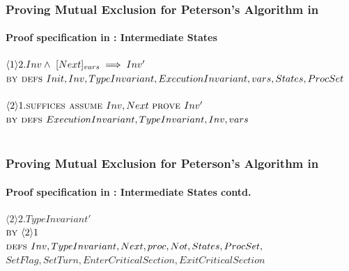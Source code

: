 \documentclass[xcolor=dvipsnames]{beamer}
\begin{document}
\begin{frame}
	\frametitle{Proving Mutual Exclusion for Peterson's Algorithm in \tla}
	\framesubtitle{Proof specification in \tla : Intermediate States}
	\fontsize{8}{7.2}\selectfont
	\hspace*{0cm}$\langle1\rangle2. Inv \land \  [Next]_{vars} \implies Inv'$\\
	\hspace*{0.4cm} $\textsc{by } \textsc{defs } Init, Inv, TypeInvariant, ExecutionInvariant, vars,States,ProcSet$\\~\\
	\hspace*{0.8cm}$\langle2\rangle1. \textsc{suffices } \textsc{assume } Inv,Next\  \textsc{prove } Inv'$\\
	\hspace*{1.2cm} $\textsc{by } \textsc{defs } ExecutionInvariant,TypeInvariant,Inv,vars$\\~\\
\end{frame}

\begin{frame}
	\frametitle{Proving Mutual Exclusion for Peterson's Algorithm in \tla}
	\framesubtitle{Proof specification in \tla : Intermediate States contd.}
	\fontsize{8}{10}\selectfont
	
	\hspace*{0cm}$\langle2\rangle2. TypeInvariant'$\\
	\hspace*{0.4cm} $\textsc{by } \langle2\rangle1$\\
	\hspace*{0.4cm}$ \textsc{defs } Inv, TypeInvariant, Next, proc, Not, States, ProcSet,$\\
	\hspace*{0.4cm}$ SetFlag, SetTurn, EnterCriticalSection, ExitCriticalSection$\\~\\
\end{frame}
\end{document}
